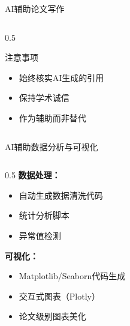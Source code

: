 \documentclass[aspectratio=169,11pt]{beamer}
\begin{document}
\begin{frame}{AI辅助论文写作}
\begin{columns}
\begin{column}{0.5\textwidth}
            \vspace{0.3cm}
            \begin{alertblock}{注意事项}
                \begin{itemize}
                    \item 始终核实AI生成的引用
                    \item 保持学术诚信
                    \item 作为辅助而非替代
                \end{itemize}
            \end{alertblock}
        \end{column}
    \end{columns}
\end{frame}

\begin{frame}{AI辅助数据分析与可视化}
    \begin{columns}
        \begin{column}{0.5\textwidth}
            \textbf{数据处理：}
            \begin{itemize}
                \item 自动生成数据清洗代码
                \item 统计分析脚本
                \item 异常值检测
            \end{itemize}
            
            \vspace{0.3cm}
            \textbf{可视化：}
            \begin{itemize}
                \item Matplotlib/Seaborn代码生成
                \item 交互式图表（Plotly）
                \item 论文级别图表美化
            \end{itemize}
            

\end{column}
\end{columns}
\end{frame}
\end{document}
